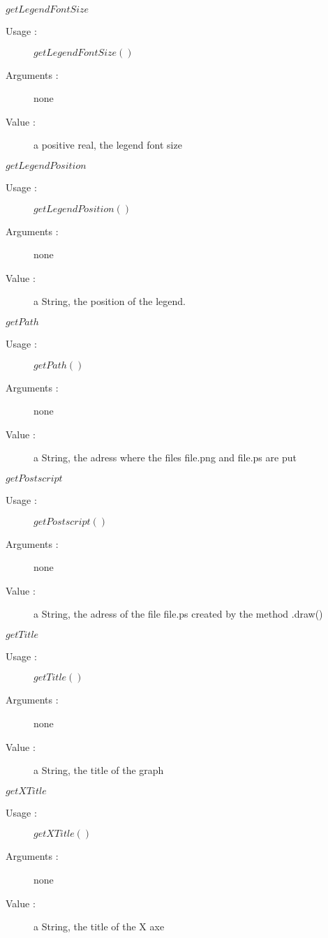 \begin{description}
\begin{description}
  \item $getLegendFontSize$
    \begin{description}
    \item[Usage :] $getLegendFontSize()$
    \item[Arguments :] none
    \item[Value :] a positive real, the legend font size
    \end{description}
    \bigskip

  \item $getLegendPosition$
    \begin{description}
    \item[Usage :] $getLegendPosition()$
    \item[Arguments :] none
    \item[Value :] a String, the position of the legend.
    \end{description}
    \bigskip


  \item $getPath$
    \begin{description}
    \item[Usage :] $getPath()$
    \item[Arguments :] none
    \item[Value :] a String, the adress where the files file.png and file.ps are put
    \end{description}
    \bigskip

  \item $getPostscript$
    \begin{description}
    \item[Usage :] $getPostscript()$
    \item[Arguments :] none
    \item[Value :] a String, the adress of the file file.ps created by the method .draw()
    \end{description}
    \bigskip

  \item $getTitle$
    \begin{description}
    \item[Usage :] $getTitle()$
    \item[Arguments :] none
    \item[Value :] a String, the title of the graph
    \end{description}
    \bigskip

  \item $getXTitle$
    \begin{description}
    \item[Usage :] $getXTitle()$
    \item[Arguments :] none
    \item[Value :] a String, the title of the X axe
    \end{description}
    \bigskip


\end{description}
\end{description}
